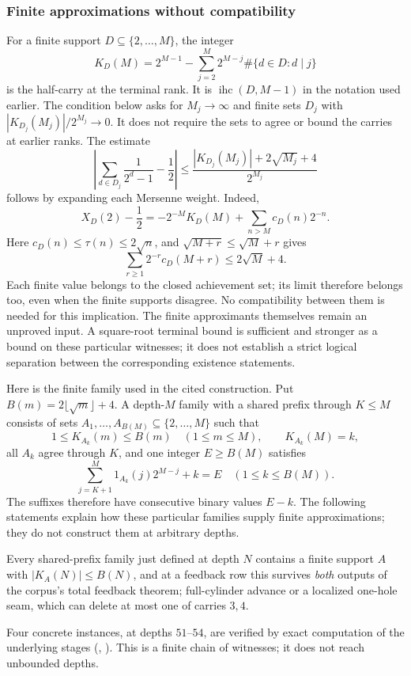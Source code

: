 \subsubsection{Finite approximations without compatibility}
For a finite support $D\subseteq\{2,\ldots,M\}$, the integer
\[
 K_D(M)=2^{M-1}-\sum_{j=2}^{M}2^{M-j}\#\{d\in D:d\mid j\}
\]
is the half-carry at the terminal rank.  It is
$\operatorname{ihc}(D,M-1)$ in the notation used earlier.  The condition
below asks for $M_j\to\infty$ and finite sets $D_j$ with
$|K_{D_j}(M_j)|/2^{M_j}\to0$.  It does not require the sets to agree or
bound the carries at earlier ranks.
The estimate
\[
 \left|\sum_{d\in D_j}\frac1{2^d-1}-\frac12\right|
 \le\frac{|K_{D_j}(M_j)|+2\sqrt{M_j}+4}{2^{M_j}}
\]
follows by expanding each Mersenne weight. Indeed,
\[
 X_D(2)-\frac12=-2^{-M}K_D(M)
       +\sum_{n>M}c_D(n)2^{-n}.
\]
Here $c_D(n)\le\tau(n)\le2\sqrt n$, and
$\sqrt{M+r}\le\sqrt M+r$ gives
\[
 \sum_{r\ge1}2^{-r}c_D(M+r)\le2\sqrt M+4.
\]
Each finite value belongs to the closed achievement set; its limit
therefore belongs too, even when the finite supports disagree.
No compatibility between them is needed for this implication.
The finite approximants themselves remain an unproved input.
A square-root terminal bound is sufficient and stronger as a bound on
these particular witnesses; it does not establish a strict logical
separation between the corresponding existence statements.


Here is the finite family used in the cited construction.  Put
$B(m)=2\lfloor\sqrt m\rfloor+4$.  A depth-$M$ family with a shared
prefix through $K\le M$ consists of sets
$A_1,\ldots,A_{B(M)}\subseteq\{2,\ldots,M\}$ such that
\[
 1\le K_{A_k}(m)\le B(m)\quad(1\le m\le M),
 \qquad K_{A_k}(M)=k,
\]
all $A_k$ agree through $K$, and one integer $E\ge B(M)$ satisfies
\[
 \sum_{j=K+1}^{M}1_{A_k}(j)2^{M-j}+k=E
 \quad(1\le k\le B(M)).
\]
The suffixes therefore have consecutive binary values $E-k$.
The following statements explain how these particular families supply
finite approximations; they do not construct them at arbitrary depths.

\begin{prop}\label{prop:finite-approximations-without-compatibility}
Every shared-prefix family just defined at depth $N$ contains a finite
support $A$ with $|K_A(N)|\le B(N)$, and at a feedback row this survives \emph{both} outputs of
the corpus's total feedback theorem; full-cylinder advance or a localized one-hole seam, which
can delete at most one of carries $3,4$.
\end{prop}
Four concrete instances, at depths $51$--$54$, are verified by exact computation of the
underlying stages
(,
).
This is a finite chain of witnesses; it does not reach unbounded depths.

